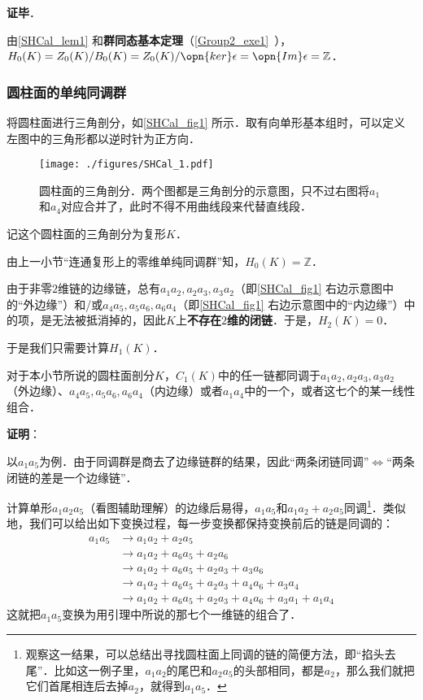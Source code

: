 \textbf{证毕}．

由\autoref{SHCal_lem1} 和\textbf{群同态基本定理}（\autoref{Group2_exe1}~），$H_0(K)=Z_0(K)/B_0(K)=Z_0(K)/\opn{ker}\epsilon=\opn{Im}\epsilon=\mathbb{Z}$．



\subsubsection{圆柱面的单纯同调群}

将圆柱面进行三角剖分，如\autoref{SHCal_fig1} 所示．取有向单形基本组时，可以定义左图中的三角形都以逆时针为正方向．

\begin{figure}[ht]
\centering
\texttt{[image: ./figures/SHCal\_1.pdf]}
\caption{圆柱面的三角剖分．两个图都是三角剖分的示意图，只不过右图将$a_1$和$a_4$对应合并了，此时不得不用曲线段来代替直线段．} \label{SHCal_fig1}
\end{figure}

记这个圆柱面的三角剖分为复形$K$．

由上一小节“连通复形上的零维单纯同调群”知，$H_0(K)=\mathbb{Z}$．

由于非零$2$维链的边缘链，总有$a_1a_2, a_2a_3, a_3a_2$（即\autoref{SHCal_fig1} 右边示意图中的“外边缘”）和/或$a_4a_5, a_5a_6, a_6a_4$（即\autoref{SHCal_fig1} 右边示意图中的“内边缘”）中的项，是无法被抵消掉的，因此$K$上\textbf{不存在}$2$\textbf{维的闭链}．于是，$H_2(K)=0$．

于是我们只需要计算$H_1(K)$．

\begin{lemma}{}\label{SHCal_lem2}
对于本小节所说的圆柱面剖分$K$，$C_1(K)$中的任一链都同调于$a_1a_2, a_2a_3, a_3a_2$（外边缘）、$a_4a_5, a_5a_6, a_6a_4$（内边缘）或者$a_1a_4$中的一个，或者这七个的某一线性组合．
\end{lemma}

\textbf{证明}：

以$a_1a_5$为例．由于同调群是商去了边缘链群的结果，因此“两条闭链同调”$\iff$“两条闭链的差是一个边缘链”．

计算单形$a_1a_2a_5$（看图辅助理解）的边缘后易得，$a_1a_5$和$a_1a_2+a_2a_5$同调\footnote{观察这一结果，可以总结出寻找圆柱面上同调的链的简便方法，即“掐头去尾”．比如这一例子里，$a_1a_2$的尾巴和$a_2a_5$的头部相同，都是$a_2$，那么我们就把它们首尾相连后去掉$a_2$，就得到$a_1a_5$．}．类似地，我们可以给出如下变换过程，每一步变换都保持变换前后的链是同调的：
\begin{equation}\label{SHCal_eq1}
\begin{aligned}
a_1a_5&\to a_1a_2+a_2a_5\\
&\to a_1a_2+a_6a_5+a_2a_6\\
&\to a_1a_2+a_6a_5+a_2a_3+a_3a_6\\&
\to a_1a_2+a_6a_5+a_2a_3+a_4a_6+a_3a_4\\
&\to a_1a_2+a_6a_5+a_2a_3+a_4a_6+a_3a_1+a_1a_4
\end{aligned}
\end{equation}
这就把$a_1a_5$变换为用引理中所说的那七个一维链的组合了．

